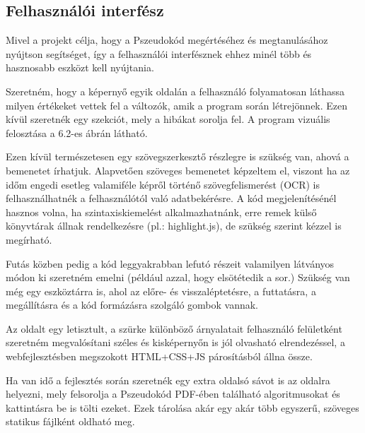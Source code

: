 \subsection{Felhasználói interfész}

Mivel a projekt célja, hogy a Pszeudokód megértéséhez és megtanulásához nyújtson segítséget, így a felhasználói interfésznek ehhez minél több és hasznosabb eszközt kell nyújtania.

Szeretném, hogy a képernyő egyik oldalán a felhasználó folyamatosan láthassa milyen értékeket vettek fel a változók, amik a program során létrejönnek. Ezen kívül szeretnék egy szekciót, mely a hibákat sorolja fel. A program vizuális felosztása a 6.2-es ábrán látható.


Ezen kívül természetesen egy szövegszerkesztő részlegre is szükség van, ahová a bemenetet írhatjuk. Alapvetően szöveges bemenetet képzeltem el, viszont ha az időm engedi esetleg valamiféle képről történő szövegfelismerést (OCR) is felhasználhatnék a felhasználótól való adatbekérésre. A kód megjelenítésénél hasznos volna, ha szintaxiskiemelést alkalmazhatnánk, erre remek külső könyvtárak állnak rendelkezésre (pl.: highlight.js), de szükség szerint kézzel is megírható.

Futás közben pedig a kód leggyakrabban lefutó részeit valamilyen látványos módon ki szeretném emelni (például azzal, hogy elsötétedik a sor.) Szükség van még egy eszköztárra is, ahol az előre- és visszaléptetésre, a futtatásra, a megállításra és a kód formázásra szolgáló gombok vannak.

Az oldalt egy letisztult, a szürke különböző árnyalatait felhasználó felületként szeretném megvalósítani széles és kisképernyőn is jól olvasható elrendezéssel, a webfejlesztésben megszokott HTML+CSS+JS párosításból állna össze.

Ha van idő a fejlesztés során szeretnék egy extra oldalsó sávot is az oldalra helyezni, mely felsorolja a Pszeudokód PDF-ében található algoritmusokat és kattintásra be is tölti ezeket. Ezek tárolása akár egy akár több egyszerű, szöveges statikus fájlként oldható meg.
